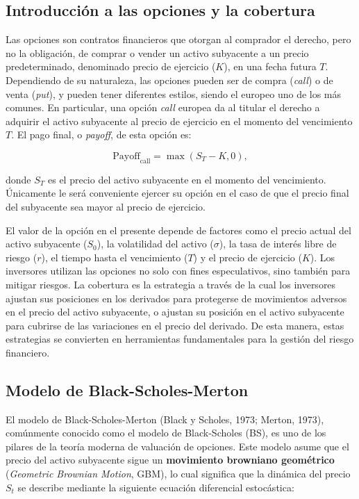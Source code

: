 \documentclass[11pt,a4paper,spanish]{article}
\numberwithin{equation}{section} %
\begin{document}
\subsection{Introducción a las opciones y la cobertura}

Las opciones son contratos financieros que otorgan al comprador el derecho, pero no la obligación, de comprar o vender un activo subyacente a un precio predeterminado, denominado precio de ejercicio ($K$), en una fecha futura $T$. Dependiendo de su naturaleza, las opciones pueden ser de compra (\textit{call}) o de venta (\textit{put}), y pueden tener diferentes estilos, siendo el europeo uno de los más comunes. En particular, una opción \textit{call }europea da al titular el derecho a adquirir el activo subyacente al precio de ejercicio en el momento del vencimiento $T$. El pago final, o \textit{payoff}, de esta opción es:

\begin{equation}
\text{Payoff}_{\text{call}} = \max(S_T - K, 0),
\end{equation}


donde $S_T$ es el precio del activo subyacente en el momento del vencimiento. Únicamente le será conveniente ejercer su opción en el caso de que el precio final del subyacente sea mayor al precio de ejercicio. 

El valor de la opción en el presente depende de factores como el precio actual del activo subyacente ($S_0$), la volatilidad del activo ($\sigma$), la tasa de interés libre de riesgo ($r$), el tiempo hasta el vencimiento ($T$) y el precio de ejercicio ($K$). Los inversores utilizan las opciones no solo con fines especulativos, sino también para mitigar riesgos. La cobertura es la estrategia a través de la cual los inversores ajustan sus posiciones en los derivados para protegerse de movimientos adversos en el precio del activo subyacente, o ajustan su posición en el activo subyacente para cubrirse de las variaciones en el precio del derivado. De esta manera, estas estrategias se convierten en herramientas fundamentales para la gestión del riesgo financiero.

\subsection{Modelo de Black-Scholes-Merton}\label{subsec:bsm}

El modelo de Black-Scholes-Merton (Black y Scholes, 1973; Merton, 1973), comúnmente conocido como el modelo de Black-Scholes (BS), es uno de los pilares de la teoría moderna de valuación de opciones. Este modelo asume que el precio del activo subyacente sigue un \textbf{movimiento browniano geométrico} (\textit{Geometric Brownian Motion}, GBM), lo cual significa que la dinámica del precio $S_t$ se describe mediante la siguiente ecuación diferencial estocástica:
\end{document}
